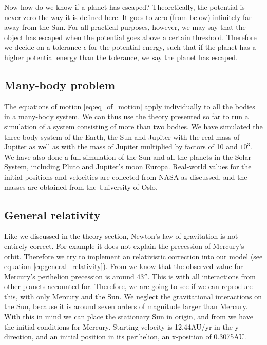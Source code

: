 \documentclass[reprint, english,notitlepage,nofootinbib]{revtex4-1}  %
\begin{document}
Now how do we know if a planet has escaped? Theoretically, the potential is never zero the way it is defined here. It goes to zero (from below) infinitely far away from the Sun. For all practical purposes, however, we may say that the object has escaped when the potential goes above a certain threshold. Therefore we decide on a tolerance $\epsilon$ for the potential energy, such that if the planet has a higher potential energy than the tolerance, we say the planet has escaped.


\subsection{Many-body problem}

The equations of motion \eqref{eq:eq_of_motion} apply individually to all the bodies in a many-body system. We can thus use the theory presented so far to run a simulation of a system consisting of more than two bodies. We have simulated the three-body system of the Earth, the Sun and Jupiter with the real mass of Jupiter as well as with the mass of Jupiter multiplied by factors of 10 and $10^3$. We have also done a full simulation of the Sun and all the planets in the Solar System, including Pluto and Jupiter's moon Europa. Real-world values for the initial positions and velocities are collected from NASA as discussed, and the masses are obtained from the University of Oslo\citep{oppgavetekst}.


\subsection{General relativity}

Like we discussed in the theory section, Newton's law of gravitation is not entirely correct. For example it does not explain the precession of Mercury's orbit. Therefore we try to implement an relativistic correction into our model (see equation \eqref{eq:general_relativity}). From \citep{oppgavetekst} we know that the observed value for Mercury's perihelion precession is around $43''$. This is with all interactions from other planets accounted for. Therefore, we are going to see if we can reproduce this, with only Mercury and the Sun. We neglect the gravitational interactions on the Sun, because it is around seven orders of magnitude larger than Mercury. With this in mind we can place the stationary Sun in origin, and from \citep{oppgavetekst} we have the initial conditions for Mercury. Starting velocity is 12.44AU/yr in the y-direction, and an initial position in its perihelion, an x-position of 0.3075AU.
\end{document}
